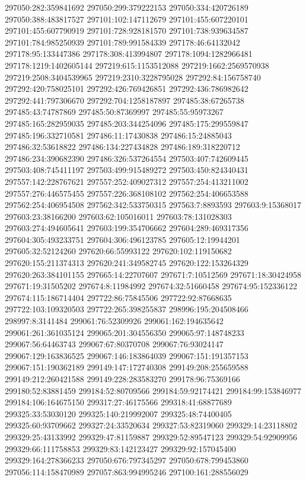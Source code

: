 297050:282:359841692
297050:299:379222153
297050:334:420726189
297050:388:483817527
297101:102:147112679
297101:455:607220101
297101:455:607790919
297101:728:928181570
297101:738:939634587
297101:784:985250939
297101:789:991584339
297178:46:64132042
297178:95:133447386
297178:308:413994807
297178:1094:1282966481
297178:1219:1402605144
297219:615:1153512088
297219:1662:2569570938
297219:2508:3404539965
297219:2310:3228795028
297292:84:156758740
297292:420:758025101
297292:426:769426851
297292:436:786982642
297292:441:797306670
297292:704:1258187897
297485:38:67265738
297485:43:74787869
297485:50:87369997
297485:55:95973267
297485:165:282959035
297485:203:344254096
297485:175:299559847
297485:196:332710581
297486:11:17430838
297486:15:24885043
297486:32:53618822
297486:134:227434828
297486:189:318220712
297486:234:390682390
297486:326:537264554
297503:407:742609445
297503:408:745411197
297503:499:915489272
297503:450:824340431
297557:142:228767621
297557:252:409027312
297557:254:413211002
297557:276:446575455
297557:226:368108102
297562:254:406653588
297562:254:406954508
297562:342:533750315
297563:7:8893593
297603:9:15368017
297603:23:38166200
297603:62:105016011
297603:78:131028303
297603:274:494605641
297603:199:354706662
297604:289:469317356
297604:305:493233751
297604:306:496123785
297605:12:19944201
297605:32:52124260
297620:66:55993122
297620:102:119150682
297620:155:211374313
297620:241:349582745
297620:122:153264329
297620:263:384101155
297665:14:22707607
297671:7:10512569
297671:18:30424958
297671:19:31505202
297674:8:11984992
297674:32:51660458
297674:95:152336122
297674:115:186714404
297722:86:75845506
297722:92:87668635
297722:103:109320503
297722:265:398255837
298996:195:204508466
298997:8:3141484
299061:76:52309926
299061:162:194635642
299061:261:361035124
299065:201:304556350
299065:97:148748233
299067:56:64463743
299067:67:80370708
299067:76:93024147
299067:129:163836525
299067:146:183864039
299067:151:191357153
299067:151:190362189
299149:147:172740308
299149:208:255659588
299149:212:260421588
299149:228:283583270
299178:96:75369166
299180:52:83881459
299184:52:80709566
299184:59:92174421
299184:99:153846977
299184:106:164675150
299317:27:46175566
299318:41:68877689
299325:33:53030120
299325:140:219992007
299325:48:74400405
299325:60:93709662
299327:24:33520634
299327:53:82319060
299329:14:23118802
299329:25:43133992
299329:47:81159887
299329:52:89547123
299329:54:92909956
299329:66:111758853
299329:83:142123427
299329:92:157045400
299329:164:278366233
297050:676:797345297
297050:678:799453860
297056:114:158470989
297057:863:994995246
297100:161:288556029
